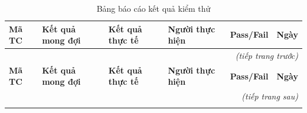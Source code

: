\documentclass[a4paper,12pt]{extreport}
\begin{document}
\renewcommand{\arraystretch}{1.2}
\begin{longtable}{|p{1.3cm}|p{3.5cm}|p{3.5cm}|p{2.5cm}|p{1.5cm}|p{1.5cm}|}
    \caption{Bảng báo cáo kết quả kiểm thử}
    \label{tab:testcase_result} \\
    \hline
    \textbf{Mã TC} & \textbf{Kết quả mong đợi} & \textbf{Kết quả thực tế} & \textbf{Người thực hiện} & \textbf{Pass/Fail} & \textbf{Ngày} \\ \hline
    \endfirsthead
    \multicolumn{6}{r}{\textit{(tiếp trang trước)}} \\
    \hline
    \textbf{Mã TC} & \textbf{Kết quả mong đợi} & \textbf{Kết quả thực tế} & \textbf{Người thực hiện} & \textbf{Pass/Fail} & \textbf{Ngày} \\ \hline
    \endhead
    \hline \multicolumn{6}{r}{\textit{(tiếp trang sau)}} \\
    \endfoot
    \hline
    \endlastfoot


\end{longtable}
\end{document}
